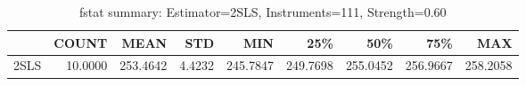 \begin{table}[ht]
\centering
\caption{fstat summary: Estimator=2SLS, Instruments=111, Strength=0.60}
\begin{tabular}{lrrrrrrrr}
\toprule
 & COUNT & MEAN & STD & MIN & 25\% & 50\% & 75\% & MAX \\
\midrule
2SLS & 10.0000 & 253.4642 & 4.4232 & 245.7847 & 249.7698 & 255.0452 & 256.9667 & 258.2058 \\
\bottomrule
\end{tabular}
\end{table}
